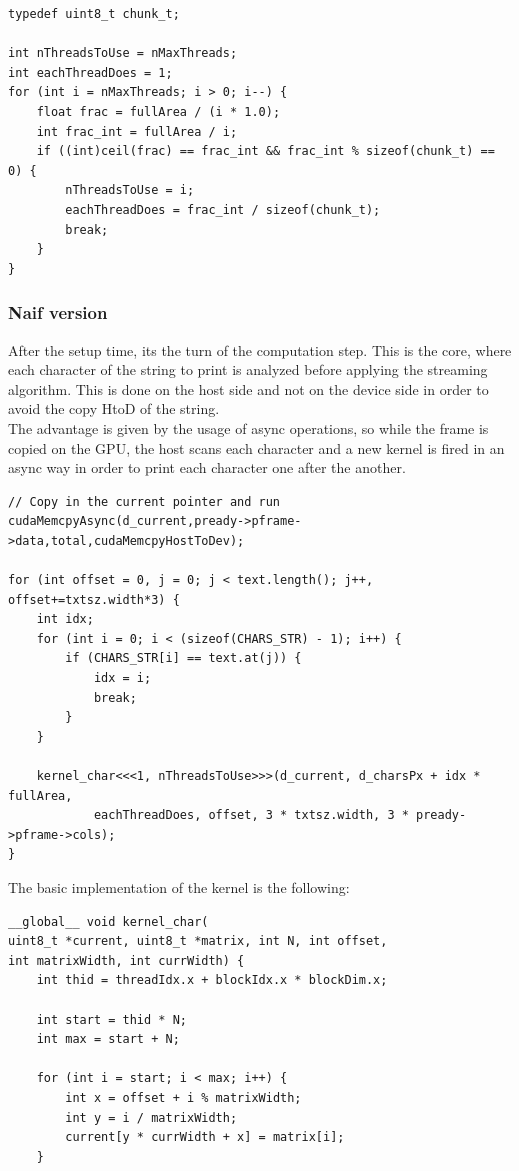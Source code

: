 \documentclass[paper=a4, fontsize=10pt]{scrartcl}	%
\begin{document}
	\begin{lstlisting}[style=CStyle]
typedef uint8_t chunk_t;

int nThreadsToUse = nMaxThreads;
int eachThreadDoes = 1;
for (int i = nMaxThreads; i > 0; i--) {
	float frac = fullArea / (i * 1.0);
	int frac_int = fullArea / i;
	if ((int)ceil(frac) == frac_int && frac_int % sizeof(chunk_t) == 0) {
		nThreadsToUse = i;
		eachThreadDoes = frac_int / sizeof(chunk_t);
		break;
	}
}
\end{lstlisting}

\subsubsection{Naif version}

After the setup time, its the turn of the computation step. This is the core, where each character of the string to print is analyzed before applying the streaming algorithm. This is done on the host side and not on the device side in order to avoid the copy HtoD of the string.\\

The advantage is given by the usage of async operations, so while the frame is copied on the GPU, the host scans each character and a new kernel is fired in an async way in order to print each character one after the another.

	\begin{lstlisting}[style=CStyle]
// Copy in the current pointer and run 
cudaMemcpyAsync(d_current,pready->pframe->data,total,cudaMemcpyHostToDev);

for (int offset = 0, j = 0; j < text.length(); j++, offset+=txtsz.width*3) {
	int idx;
	for (int i = 0; i < (sizeof(CHARS_STR) - 1); i++) {
		if (CHARS_STR[i] == text.at(j)) {
			idx = i;
			break;
		}
	}

	kernel_char<<<1, nThreadsToUse>>>(d_current, d_charsPx + idx * fullArea,
			eachThreadDoes, offset, 3 * txtsz.width, 3 * pready->pframe->cols);
}
\end{lstlisting}

The basic implementation of the kernel is the following:

	\begin{lstlisting}[style=CStyle]
__global__ void kernel_char(
uint8_t *current, uint8_t *matrix, int N, int offset, 
int matrixWidth, int currWidth) {
    int thid = threadIdx.x + blockIdx.x * blockDim.x;

    int start = thid * N;
    int max = start + N;

    for (int i = start; i < max; i++) {
        int x = offset + i % matrixWidth;
        int y = i / matrixWidth;
        current[y * currWidth + x] = matrix[i];
    } 
	\end{lstlisting}
\end{document}
